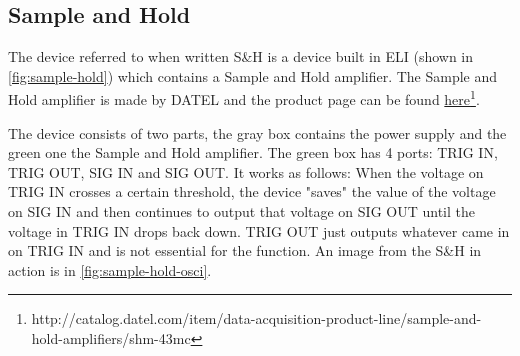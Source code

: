 \documentclass[a4paper, 10pt]{article}
\begin{document}
\subsection{Sample and Hold} \label{subsec:sample-hold}
The device referred to when written S\&H is a device built in ELI (shown in \cref{fig:sample-hold}) which contains a Sample and Hold amplifier.
The Sample and Hold amplifier is made by DATEL and the product page can be found \href{http://catalog.datel.com/item/data-acquisition-product-line/sample-and-hold-amplifiers/shm-43mc}{here}\footnote{http://catalog.datel.com/item/data-acquisition-product-line/sample-and-hold-amplifiers/shm-43mc}.

The device consists of two parts, the gray box contains the power supply and the green one the Sample and Hold amplifier.
The green box has 4 ports: TRIG IN, TRIG OUT, SIG IN and SIG OUT.
It works as follows: When the voltage on TRIG IN crosses a certain threshold, the device "saves" the value of the voltage on SIG IN and then continues to output that voltage on SIG OUT until the voltage in TRIG IN drops back down.
TRIG OUT just outputs whatever came in on TRIG IN and is not essential for the function.
An image from the S\&H in action is in \cref{fig:sample-hold-osci}.
\end{document}
